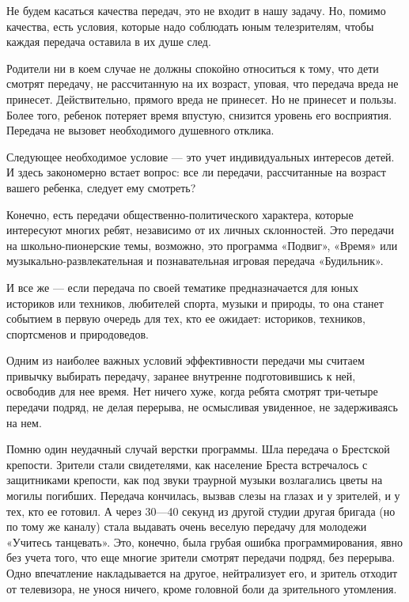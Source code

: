 \documentclass[12pt, a4paper, openany]{book}
\begin{document}
Не будем касаться качества передач, это не входит в нашу задачу. Но, помимо качества, есть условия, которые надо соблюдать юным телезрителям, чтобы каждая передача оставила в их душе след. 

Родители ни в коем случае не должны спокойно относиться к тому, что дети смотрят передачу, не рассчитанную на их возраст, уповая, что передача вреда не принесет. Действительно, прямого вреда не принесет. Но не принесет и пользы. Более того, ребенок потеряет время впустую, снизится уровень его восприятия. Передача не вызовет необходимого душевного отклика. 

Следующее необходимое условие — это учет индивидуальных интересов детей. И здесь закономерно встает вопрос: все ли передачи, рассчитанные на возраст вашего ребенка, следует ему смотреть? 

Конечно, есть передачи общественно-политического характера, которые интересуют многих ребят, независимо от их личных склонностей. Это передачи на школьно-пионерские темы, возможно, это программа «Подвиг», «Время» или музыкально-развлекательная и познавательная игровая передача «Будильник». 

И все же — если передача по своей тематике предназначается для юных историков или техников, любителей спорта, музыки и природы, то она станет событием в первую очередь для тех, кто ее ожидает: историков, техников, спортсменов и природоведов. 

Одним из наиболее важных условий эффективности передачи мы считаем привычку выбирать передачу, заранее внутренне подготовившись к ней, освободив для нее время. Нет ничего хуже, когда ребята смотрят три-четыре передачи подряд, не делая перерыва, не осмысливая увиденное, не задерживаясь на нем. 

Помню один неудачный случай верстки программы. Шла передача о Брестской крепости. Зрители стали свидетелями, как население Бреста встречалось с защитниками крепости, как под звуки траурной музыки возлагались цветы на могилы погибших. Передача кончилась, вызвав слезы на глазах и у зрителей, и у тех, кто ее готовил. А через 30—40 секунд из другой студии другая бригада (но по тому же каналу) стала выдавать очень веселую передачу для молодежи «Учитесь танцевать». Это, конечно, была грубая ошибка программирования, явно без учета того, что еще многие зрители смотрят передачи подряд, без перерыва. Одно впечатление накладывается на другое, нейтрализует его, и зритель отходит от телевизора, не унося ничего, кроме головной боли да зрительного утомления. 
\end{document}
